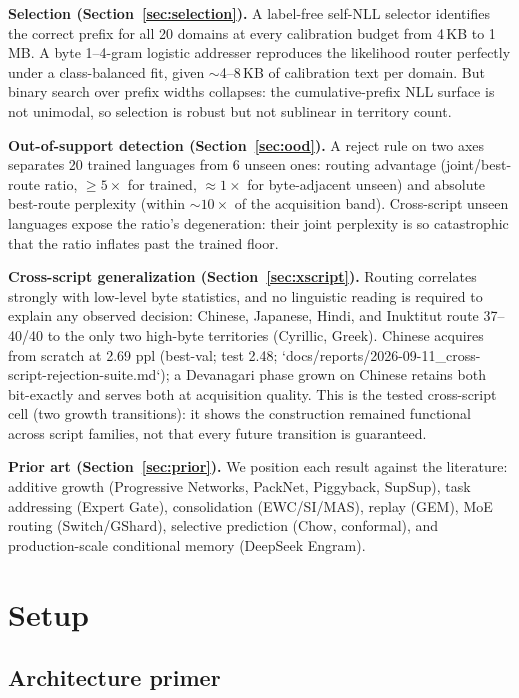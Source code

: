 \documentclass[11pt]{article}
\theoremstyle{definition}\newtheorem{definition}{Definition}
\theoremstyle{remark}\newtheorem{remark}{Remark}
\begin{document}
\textbf{Selection (Section~\ref{sec:selection}).} A label-free self-NLL selector identifies the correct prefix for all 20 domains at every calibration budget from 4\,KB to 1\,MB. A byte 1--4-gram logistic addresser reproduces the likelihood router perfectly under a class-balanced fit, given $\sim$4--8\,KB of calibration text per domain. But binary search over prefix widths collapses: the cumulative-prefix NLL surface is not unimodal, so selection is robust but not sublinear in territory count.

\textbf{Out-of-support detection (Section~\ref{sec:ood}).} A reject rule on two axes separates 20 trained languages from 6 unseen ones: routing advantage (joint/best-route ratio, $\ge 5\times$ for trained, $\approx 1\times$ for byte-adjacent unseen) and absolute best-route perplexity (within $\sim 10\times$ of the acquisition band). Cross-script unseen languages expose the ratio's degeneration: their joint perplexity is so catastrophic that the ratio inflates past the trained floor.

\textbf{Cross-script generalization (Section~\ref{sec:xscript}).} Routing correlates strongly with low-level byte statistics, and no linguistic reading is required to explain any observed decision: Chinese, Japanese, Hindi, and Inuktitut route 37--40/40 to the only two high-byte territories (Cyrillic, Greek). Chinese acquires from scratch at 2.69 ppl (best-val; test 2.48; `docs/reports/2026-09-11\_cross-script-rejection-suite.md`); a Devanagari phase grown on Chinese retains both bit-exactly and serves both at acquisition quality. This is the tested cross-script cell (two growth transitions): it shows the construction remained functional across script families, not that every future transition is guaranteed.

\textbf{Prior art (Section~\ref{sec:prior}).} We position each result against the literature: additive growth (Progressive Networks, PackNet, Piggyback, SupSup), task addressing (Expert Gate), consolidation (EWC/SI/MAS), replay (GEM), MoE routing (Switch/GShard), selective prediction (Chow, conformal), and production-scale conditional memory (DeepSeek Engram).

\section{Setup}
\label{sec:setup}

\subsection{Architecture primer}\label{sec:primer}
\end{document}
